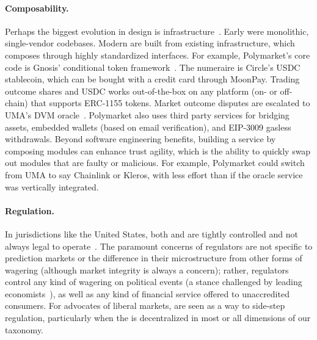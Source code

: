 \paragraph{Composability.} Perhaps the biggest evolution in \depm design is infrastructure~\cite{Gun24}. Early \depms were monolithic, single-vendor codebases. Modern \depms are built from existing infrastructure, which composes through highly standardized interfaces. For example, Polymarket's core \depm code is Gnosis' conditional token framework~\cite{ctf}. The numeraire is Circle's USDC stablecoin, which can be bought with a credit card through MoonPay. Trading outcome shares and USDC works out-of-the-box on any platform (on- or off-chain) that supports ERC-1155 tokens. Market outcome disputes are escalated to UMA's DVM oracle~\cite{uma}. Polymarket also uses third party services for bridging assets, embedded wallets (based on email verification), and EIP-3009 gasless withdrawals. Beyond software engineering benefits, building a service by composing modules can enhance trust agility, which is the ability to quickly swap out modules that are faulty or malicious. For example, Polymarket could switch from UMA to say Chainlink or Kleros, with less effort than if the oracle service was vertically integrated. 



\paragraph{Regulation.} In jurisdictions like the United States, both \cepms and \depms are tightly controlled and not always legal to operate~\cite{Du19,Ma24}. The paramount concerns of regulators are not specific to prediction markets or the difference in their microstructure from other forms of wagering (although market integrity is always a concern); rather, regulators control any kind of wagering on political events (a stance challenged by leading economists~\cite{AFGH+08}), as well as any kind of financial service offered to unaccredited consumers. For advocates of liberal markets, \depms are seen as a way to side-step regulation, particularly when the \depm is decentralized in most or all dimensions of our taxonomy. 



